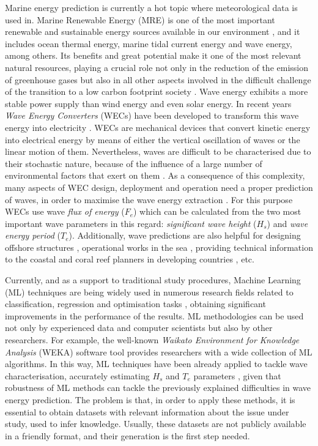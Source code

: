 \documentclass[energies,article,submit,moreauthors,pdftex]{Definitions/mdpi}
\begin{document}
		Marine energy prediction is currently a hot topic where meteorological data is used in. Marine Renewable Energy (MRE) is one of the most important renewable and sustainable energy sources available in our environment \cite{en12050787}, and it includes ocean thermal energy, marine tidal current energy and wave energy, among others. Its benefits and great potential \cite{ZEYRINGER20181281} make it one of the most relevant natural resources, playing a crucial role not only in the reduction of the emission of greenhouse gases but also in all other aspects involved in the difficult challenge of the transition to a low carbon footprint society \cite{BHATTACHARYA2017157, en12091657}. Wave energy exhibits a more stable power supply than wind energy and even solar energy. In recent years \textit{Wave Energy Converters} (WECs) \cite{FALCAO2010899} have been developed to transform this wave energy into electricity \cite{en11092289}. WECs are mechanical devices that convert kinetic energy into electrical energy by means of either the vertical oscillation of waves or the linear motion of them. Nevertheless, waves are difficult to be characterised due to their stochastic nature, because of the influence of a large number of environmental factors that exert on them \cite{ochi1998}. As a consequence of this complexity, many aspects of WEC design, deployment and operation \cite{CROWLEY2018159, Abdelkhalik2016, 6898109} need a proper prediction of waves, in order to maximise the wave energy extraction \cite{en80910370}. For this purpose WECs use wave \textit{flux of energy} ($F_e$) which can be calculated from the two most important wave parameters in this regard: \textit{significant wave height} ($H_s$) and \textit{wave energy period} ($T_e$). Additionally, wave predictions \cite{en11010011} are also helpful for designing offshore structures \cite{CHATZIIOANNOU2017126}, operational works in the sea \cite{DALGIC2015211}, providing technical information to the coastal and coral reef planners in developing countries \cite{CALLAGHAN2018123}, etc.

		Currently, and as a support to traditional study procedures, Machine Learning (ML) techniques \cite{Alpaydin:2004:IML:1036287,Bishop:2006:PRM:1162264} are being widely used in numerous research fields related to classification, regression and optimisation tasks \cite{srivastava2017large}, obtaining significant improvements in the performance of the results. ML methodologies can be used not only by experienced data and computer scientists but also by other researchers. For example, the well-known \textit{Waikato Environment for Knowledge Analysis} (WEKA) \cite{WEKA} software tool provides researchers with a wide collection of ML algorithms. In this way, ML techniques have been already applied to tackle wave characterisation, accurately estimating $H_{s}$ and $T_{e}$ parameters \cite{DURANROSAL2017268, KUMAR2017605}, given that robustness of ML methods can tackle the previously explained difficulties in wave energy prediction. The problem is that, in order to apply these methods, it is essential to obtain datasets with relevant information about the issue under study, used to infer knowledge. Usually, these datasets are not publicly available in a friendly format, and their generation is the first step needed.
\end{document}
